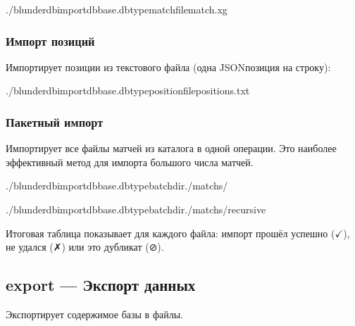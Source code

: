 \documentclass[letterpaper,10pt,russian]{sphinxmanual}
\begin{document}
\begin{sphinxVerbatim}[commandchars=\\\{\}]
./blunderdbimport\PYGZhy{}\PYGZhy{}dbbase.db\PYGZhy{}\PYGZhy{}typematch\PYGZhy{}\PYGZhy{}filematch.xg
\end{sphinxVerbatim}


\subsubsection{Импорт позиций}
\label{\detokenize{cli:import-de-positions}}
\sphinxAtStartPar
Импортирует позиции из текстового файла (одна JSON\sphinxhyphen{}позиция на строку):

\begin{sphinxVerbatim}[commandchars=\\\{\}]
./blunderdbimport\PYGZhy{}\PYGZhy{}dbbase.db\PYGZhy{}\PYGZhy{}typeposition\PYGZhy{}\PYGZhy{}filepositions.txt
\end{sphinxVerbatim}


\subsubsection{Пакетный импорт}
\label{\detokenize{cli:import-par-lot}}
\sphinxAtStartPar
Импортирует все файлы матчей из каталога в одной операции. Это наиболее эффективный метод для импорта большого числа матчей.

\begin{sphinxVerbatim}[commandchars=\\\{\}]
./blunderdbimport\PYGZhy{}\PYGZhy{}dbbase.db\PYGZhy{}\PYGZhy{}typebatch\PYGZhy{}\PYGZhy{}dir./matchs/

./blunderdbimport\PYGZhy{}\PYGZhy{}dbbase.db\PYGZhy{}\PYGZhy{}typebatch\PYGZhy{}\PYGZhy{}dir./matchs/\PYGZhy{}\PYGZhy{}recursive
\end{sphinxVerbatim}

\sphinxAtStartPar
Итоговая таблица показывает для каждого файла: импорт прошёл успешно (\(\checkmark\)), не удался (✗) или это дубликат (⊘).


\subsection{export — Экспорт данных}
\label{\detokenize{cli:export-exporter-des-donnees}}
\sphinxAtStartPar
Экспортирует содержимое базы в файлы.
\end{document}
